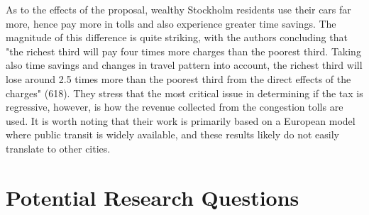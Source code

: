 \documentclass[JEL]{AEA}
\begin{document}
As to the effects of the proposal, wealthy Stockholm residents use their cars far more, hence pay more in tolls and also experience greater time savings. The magnitude of this difference is quite striking, with the authors concluding that "the richest third will pay four times more charges than the poorest third. Taking also time savings and changes in travel pattern into account, the richest third will lose around 2.5 times more than the poorest third from the direct effects of the charges" (618). They stress that the most critical issue in determining if the tax is regressive, however, is how the revenue collected from the congestion tolls are used. It is worth noting that their work is primarily based on a European model where public transit is widely available, and these results likely do not easily translate to other cities.

\section{Potential Research Questions}
\label{research-questions}
\end{document}
